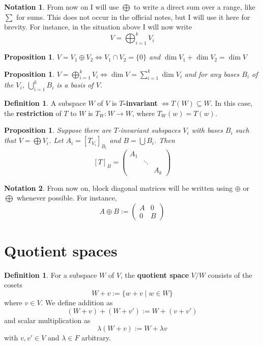 \documentclass[12pt]{article}
\newtheorem{prop}[thm]{Proposition}
\theoremstyle{definition}
\newtheorem{defn}{Definition}[section]
\newtheorem*{defn*}{Definition}
\newtheorem*{not*}{Notation}
\begin{document}
\begin{not*}
	From now on I will use $\bigoplus$ to write a direct sum over a range, like $\sum$ for sums.
	This does not occur in the official notes, but I will use it here for brevity.
	For instance, in the situation above I will now write
	$$V = \bigoplus_{i = 1}^kV_i$$
\end{not*}

\begin{prop}
	$V = V_1 \oplus V_2 \iff V_1 \cap V_2 = \{0\}$ and $\dim{V_1} + \dim{V_2} = \dim{V}$
\end{prop}

\begin{prop}
	$V = \bigoplus_{i = 1}^kV_i \iff \dim{V} = \sum_{i = 1}^k\dim{V_i}$ and for any bases $B_i$ of the $V_i$, $\bigcup_{i = 1}^kB_i$ is a basis of $V$.
\end{prop}

\begin{defn}
	A subspace $W$ of $V$ is \textbf{$T$-invariant} $\iff T(W) \subseteq W$.
	In this case, the \textbf{restriction} of $T$ to $W$ is $T_W : W \to W$, where $T_W(w) = T(w)$.
\end{defn}

\begin{prop}
	Suppose there are $T$-invariant subspaces $V_i$ with bases $B_i$ such that $V = \bigoplus V_i$. Let $A_i = [T_{V_i}]_{B_i}$ and $B = \bigcup B_i$.
	Then
	$$[T]_B = \begin{pmatrix}A_1 & & \\ & \ddots & \\ & & A_k \end{pmatrix}$$
\end{prop}

\begin{not*}
	From now on, block diagonal matrices will be written using $\oplus$ or $\bigoplus$ whenever possible.
	For instance,
	$$A \oplus B := \begin{pmatrix} A & 0 \\ 0 & B \end{pmatrix}$$
\end{not*}

\section{Quotient spaces}

\begin{defn*}
	For a subspace $W$ of $V$, the \textbf{quotient space} $V / W$ consists of the cosets
	$$W + v := \{w + v \mid w \in W\}$$
	where $v \in V$.
	We define addition as
	$$(W + v) + (W + v') := W + (v + v')$$
	and scalar multiplication as
	$$\lambda(W + v) := W + \lambda v$$
	with $v, v' \in V$ and $\lambda \in F$ arbitrary.
\end{defn*}
\end{document}
